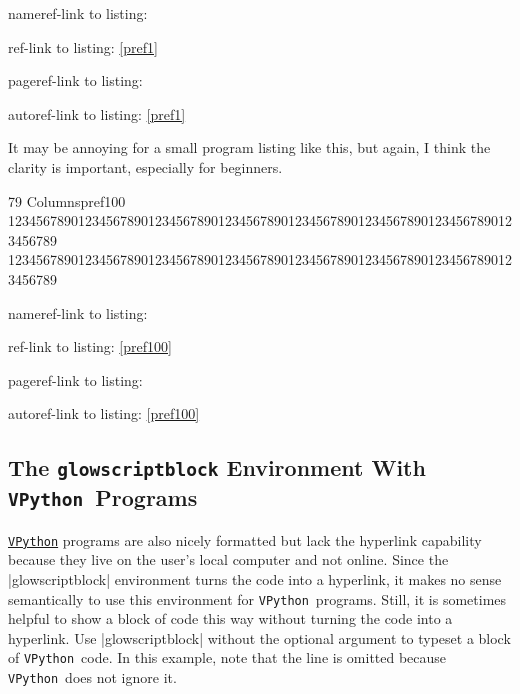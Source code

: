 \documentclass{article}
\newcommand*{\VPython}{\texttt{VPython}}              %
\begin{document}
nameref-link to listing: 

ref-link to listing: \ref{pref1}

pageref-link to listing: \pageref{pref1}

autoref-link to listing: \autoref{pref1}

\newpage
It may be annoying for a small program listing like this, but again, I think the clarity is 
important, especially for beginners. 

\begin{glowscriptblock}{79 Columns}{pref100}
1234567890123456789012345678901234567890123456789012345678901234567890123456789
1234567890123456789012345678901234567890123456789012345678901234567890123456789
\end{glowscriptblock}

nameref-link to listing: 

ref-link to listing: \ref{pref100}

pageref-link to listing: \pageref{pref100}

autoref-link to listing: \autoref{pref100}

\subsection{The \texttt{glowscriptblock} Environment With \VPython\ Programs}
\href{https://vpython.org}{\VPython} programs are also nicely formatted but lack the hyperlink capability
because they live on the user's local computer and not online. Since the |glowscriptblock| environment 
turns the code into a hyperlink, it makes no sense semantically to use this environment for \VPython\ 
programs. Still, it is sometimes helpful to show a block of code this way without turning the code into 
a hyperlink. Use |glowscriptblock| without the optional argument to typeset a block of \VPython\ code. 
In this example, note that the \vpythonline{GlowScript 3.0 VPython} line is omitted because \VPython\
does not ignore it.
\end{document}
